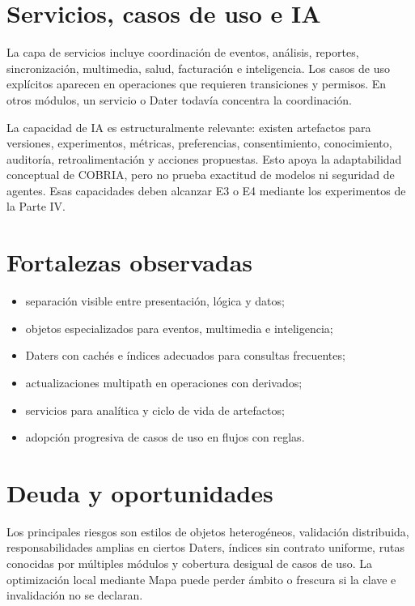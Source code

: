 \section{Servicios, casos de uso e IA}

La capa de servicios incluye coordinación de eventos, análisis, reportes, sincronización,
multimedia, salud, facturación e inteligencia. Los casos de uso explícitos aparecen en
operaciones que requieren transiciones y permisos. En otros módulos, un servicio o Dater
todavía concentra la coordinación.

La capacidad de IA es estructuralmente relevante: existen artefactos para versiones,
experimentos, métricas, preferencias, consentimiento, conocimiento, auditoría, retroalimentación
y acciones propuestas. Esto apoya la adaptabilidad conceptual de COBRIA, pero no prueba
exactitud de modelos ni seguridad de agentes. Esas capacidades deben alcanzar E3 o E4
mediante los experimentos de la Parte IV.

\section{Fortalezas observadas}

\begin{itemize}[leftmargin=*]
  \item separación visible entre presentación, lógica y datos;
  \item objetos especializados para eventos, multimedia e inteligencia;
  \item Daters con cachés e índices adecuados para consultas frecuentes;
  \item actualizaciones multipath en operaciones con derivados;
  \item servicios para analítica y ciclo de vida de artefactos;
  \item adopción progresiva de casos de uso en flujos con reglas.
\end{itemize}

\section{Deuda y oportunidades}

Los principales riesgos son estilos de objetos heterogéneos, validación distribuida,
responsabilidades amplias en ciertos Daters, índices sin contrato uniforme, rutas
conocidas por múltiples módulos y cobertura desigual de casos de uso. La optimización
local mediante Mapa puede perder ámbito o frescura si la clave e invalidación no se
declaran.

